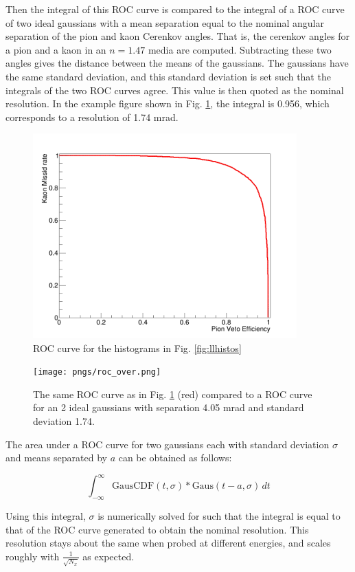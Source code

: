 \documentclass[11pt]{article}
\begin{document}
Then the integral of this ROC curve is compared to the integral of a ROC curve of two ideal gaussians with a mean separation equal to the nominal angular separation of the pion and kaon Cerenkov angles. That is, the cerenkov angles for a pion and a kaon in an $n = 1.47$ media are computed.  Subtracting these two angles gives the distance between the means of the gaussians.  The gaussians have the same standard deviation, and this standard deviation is set such that the integrals of the two ROC curves agree.  This value is then quoted as the nominal resolution.  In the example figure shown in Fig. \ref{fig:roccurve}, the integral is 0.956, which corresponds to a resolution of 1.74 mrad.
\begin{figure}
\centering
\includegraphics[width=4in]{pngs/roc_curve.png}
\caption{ROC curve for the histograms in Fig. \ref{fig:llhistos} \label{fig:roccurve}}
\end{figure}
\begin{figure}
\centering
\texttt{[image: pngs/roc\_over.png]}
\caption{The same ROC curve as in Fig. \ref{fig:roccurve} (red) compared to a ROC curve for an 2 ideal gaussians with separation 4.05 mrad and standard deviation 1.74. \label{fig:roccurve_over}}
\end{figure}

The area under a ROC curve for two gaussians each with standard deviation $\sigma$ and means separated by $a$ can be obtained as follows:

\begin{equation}
\int_{-\infty}^{\infty} \textrm{GausCDF}(t,\sigma)*\textrm{Gaus}(t-a,\sigma)\,dt
\end{equation}

Using this integral, $\sigma$ is numerically solved for such that the integral is equal to that of the ROC curve generated to obtain the nominal resolution.  This resolution stays about the same when probed at different energies, and scales roughly with $\frac{1}{\sqrt{N_x}}$ as expected.
\end{document}
